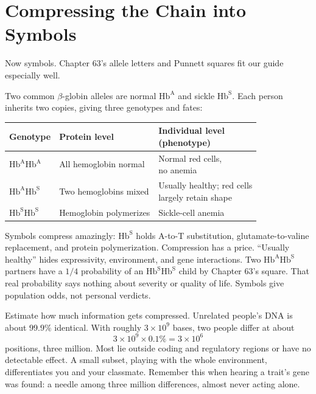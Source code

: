 \section{Compressing the Chain into Symbols}

Now symbols. Chapter 63's allele letters and Punnett squares fit our guide especially well.

Two common $\beta$-globin alleles are normal $\mathrm{Hb^{A}}$ and sickle $\mathrm{Hb^{S}}$. Each person inherits two copies, giving three genotypes and fates:

\begin{table}[h]
\centering
\begin{tabular}{@{}lll@{}}
\toprule
Genotype & Protein level & \shortstack[l]{Individual level\\(phenotype)} \\
\midrule
$\mathrm{Hb^{A}Hb^{A}}$ & All hemoglobin normal & \shortstack[l]{Normal red cells,\\no anemia} \\
$\mathrm{Hb^{A}Hb^{S}}$ & Two hemoglobins mixed & \shortstack[l]{Usually healthy; red cells\\largely retain shape} \\
$\mathrm{Hb^{S}Hb^{S}}$ & Hemoglobin polymerizes & Sickle-cell anemia \\
\bottomrule
\end{tabular}
\end{table}

Symbols compress amazingly: $\mathrm{Hb^{S}}$ holds A-to-T substitution, glutamate-to-valine replacement, and protein polymerization. Compression has a price. ``Usually healthy'' hides expressivity, environment, and gene interactions. Two $\mathrm{Hb^{A}Hb^{S}}$ partners have a $1/4$ probability of an $\mathrm{Hb^{S}Hb^{S}}$ child by Chapter 63's square. That real probability says nothing about severity or quality of life. Symbols give population odds, not personal verdicts.

Estimate how much information gets compressed. Unrelated people's DNA is about $99.9\%$ identical. With roughly $3\times 10^{9}$ bases, two people differ at about
\[3\times 10^{9}\times 0.1\% = 3\times 10^{6}\]
positions, three million. Most lie outside coding and regulatory regions or have no detectable effect. A small subset, playing with the whole environment, differentiates you and your classmate. Remember this when hearing a trait's gene was found: a needle among three million differences, almost never acting alone.

